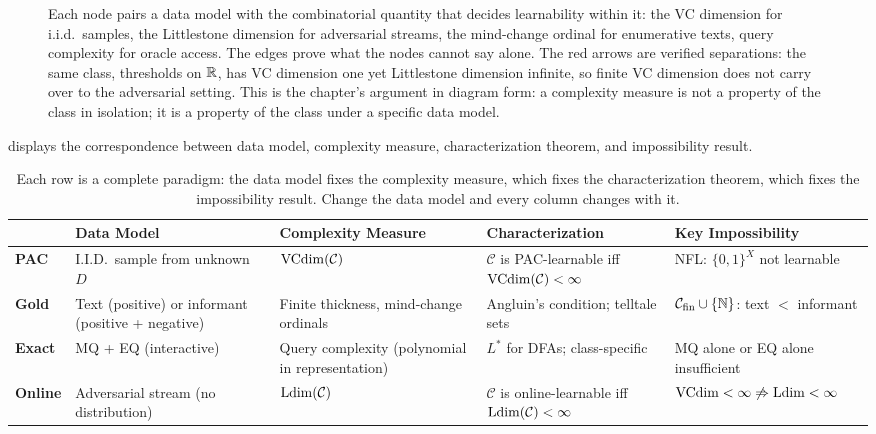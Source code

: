 \begin{figure}[ht]
\caption[The four data models, their characterizing dimensions, and the proven separations]{Each node pairs a data model with the combinatorial quantity that decides learnability within it: the VC dimension for i.i.d.\ samples, the Littlestone dimension for adversarial streams, the mind-change ordinal for enumerative texts, query complexity for oracle access. The edges prove what the nodes cannot say alone. The red arrows are verified separations: the same class, thresholds on $\mathbb{R}$, has VC dimension one yet Littlestone dimension infinite, so finite VC dimension does not carry over to the adversarial setting. This is the chapter's argument in diagram form: a complexity measure is not a property of the class in isolation; it is a property of the class under a specific data model.}
\label{fig:data-taxonomy}
\end{figure}

 displays the correspondence between data model, complexity measure, characterization theorem, and impossibility result.

\begin{table}[ht]
\centering
\small
\caption{Each row is a complete paradigm: the data model fixes the complexity measure, which fixes the characterization theorem, which fixes the impossibility result. Change the data model and every column changes with it.}
\label{tab:data-comparison}
\begin{tabularx}{\textwidth}{>{\bfseries\small}l X X X X}
\toprule
& \textbf{Data Model} & \textbf{Complexity Measure} & \textbf{Characterization} & \textbf{Key Impossibility} \\
\midrule
PAC &
I.I.D.\ sample from unknown $D$ &
$\mathrm{VCdim}(\mathcal{C})$ &
$\mathcal{C}$ is PAC-learnable iff $\mathrm{VCdim}(\mathcal{C}) < \infty$ \cite{Valiant1984} &
NFL: $\{0,1\}^X$ not learnable \\[6pt]

Gold &
Text (positive) or informant (positive + negative) &
Finite thickness, mind-change ordinals &
Angluin's condition; telltale sets \cite{Gold1967} &
$\mathcal{C}_{\mathrm{fin}} \cup \{\mathbb{N}\}$: text $<$ informant \\[6pt]

Exact &
MQ + EQ (interactive) &
Query complexity (polynomial in representation) &
$L^\ast$ for DFAs; class-specific \cite{Angluin1988} &
MQ alone or EQ alone insufficient \\[6pt]

Online &
Adversarial stream (no distribution) &
$\mathrm{Ldim}(\mathcal{C})$ &
$\mathcal{C}$ is online-learnable iff $\mathrm{Ldim}(\mathcal{C}) < \infty$ \cite{Littlestone1988} &
$\mathrm{VCdim} < \infty \not\Rightarrow \mathrm{Ldim} < \infty$ \\
\bottomrule
\end{tabularx}
\end{table}

